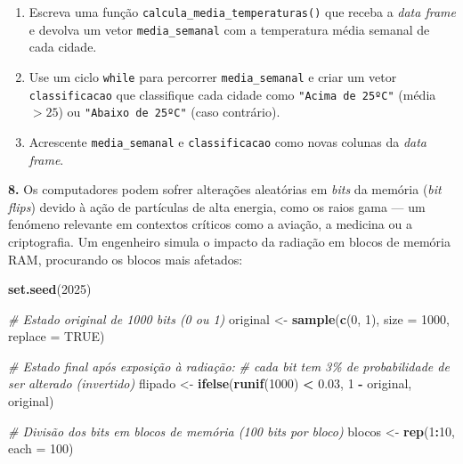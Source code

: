 \documentclass[
  portuguese,
  11pt,
  openany]{book}
\newenvironment{Shaded}{\begin{snugshade}}{\end{snugshade}}
\newcommand{\AttributeTok}[1]{\textcolor[rgb]{0.13,0.29,0.53}{#1}}
\newcommand{\CommentTok}[1]{\textcolor[rgb]{0.56,0.35,0.01}{\textit{#1}}}
\newcommand{\ConstantTok}[1]{\textcolor[rgb]{0.56,0.35,0.01}{#1}}
\newcommand{\DecValTok}[1]{\textcolor[rgb]{0.00,0.00,0.81}{#1}}
\newcommand{\FloatTok}[1]{\textcolor[rgb]{0.00,0.00,0.81}{#1}}
\newcommand{\FunctionTok}[1]{\textcolor[rgb]{0.13,0.29,0.53}{\textbf{#1}}}
\newcommand{\NormalTok}[1]{#1}
\newcommand{\OtherTok}[1]{\textcolor[rgb]{0.56,0.35,0.01}{#1}}
\newcommand{\SpecialCharTok}[1]{\textcolor[rgb]{0.81,0.36,0.00}{\textbf{#1}}}
\begin{document}
\begin{enumerate}
\def\labelenumi{(\alph{enumi})}
\item
  Escreva uma função \texttt{calcula\_media\_temperaturas()} que receba a \emph{data frame} e
  devolva um vetor \texttt{media\_semanal} com a temperatura média semanal de cada cidade.
\item
  Use um ciclo \texttt{while} para percorrer \texttt{media\_semanal} e criar um vetor
  \texttt{classificacao} que classifique cada cidade como \texttt{"Acima\ de\ 25ºC"} (média \(> 25\))
  ou \texttt{"Abaixo\ de\ 25ºC"} (caso contrário).
\item
  Acrescente \texttt{media\_semanal} e \texttt{classificacao} como novas colunas da \emph{data frame}.
\end{enumerate}

\textbf{8.} Os computadores podem sofrer alterações aleatórias em \emph{bits} da memória
(\emph{bit flips}) devido à ação de partículas de alta energia, como os raios gama --- um
fenómeno relevante em contextos críticos como a aviação, a medicina ou a criptografia.
Um engenheiro simula o impacto da radiação em blocos de memória RAM, procurando os
blocos mais afetados:

\begin{Shaded}
\begin{Highlighting}[]
\FunctionTok{set.seed}\NormalTok{(}\DecValTok{2025}\NormalTok{)}

\CommentTok{\# Estado original de 1000 bits (0 ou 1)}
\NormalTok{original }\OtherTok{\textless{}{-}} \FunctionTok{sample}\NormalTok{(}\FunctionTok{c}\NormalTok{(}\DecValTok{0}\NormalTok{, }\DecValTok{1}\NormalTok{), }\AttributeTok{size =} \DecValTok{1000}\NormalTok{, }\AttributeTok{replace =} \ConstantTok{TRUE}\NormalTok{)}

\CommentTok{\# Estado final após exposição à radiação:}
\CommentTok{\# cada bit tem 3\% de probabilidade de ser alterado (invertido)}
\NormalTok{flipado }\OtherTok{\textless{}{-}} \FunctionTok{ifelse}\NormalTok{(}\FunctionTok{runif}\NormalTok{(}\DecValTok{1000}\NormalTok{) }\SpecialCharTok{\textless{}} \FloatTok{0.03}\NormalTok{, }\DecValTok{1} \SpecialCharTok{{-}}\NormalTok{ original, original)}

\CommentTok{\# Divisão dos bits em blocos de memória (100 bits por bloco)}
\NormalTok{blocos }\OtherTok{\textless{}{-}} \FunctionTok{rep}\NormalTok{(}\DecValTok{1}\SpecialCharTok{:}\DecValTok{10}\NormalTok{, }\AttributeTok{each =} \DecValTok{100}\NormalTok{)}
\end{Highlighting}
\end{Shaded}
\end{document}
